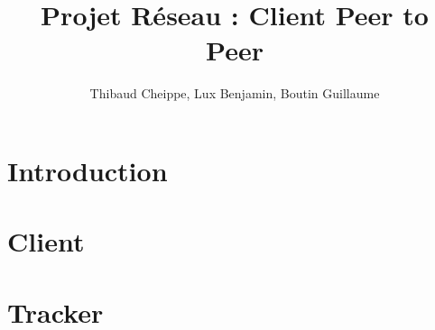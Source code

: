 \documentclass[a4paper,11pt]{report}
\title{Projet Réseau : Client Peer to Peer}
\author{Thibaud Cheippe, Lux Benjamin, Boutin Guillaume}
\begin{document}
\maketitle



\section*{Introduction}

\section{Client} 


\section{Tracker}

\end{document}
